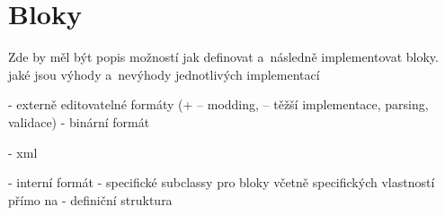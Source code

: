 
\section{Bloky}

Zde by měl být popis možností jak definovat a~následně implementovat bloky. jaké jsou výhody a~nevýhody jednotlivých implementací

- externě editovatelné formáty (+ -- modding, -- těžší implementace, parsing, validace)
- binární formát

- xml


- interní formát
- specifické subclassy pro bloky včetně specifických vlastností přímo na 
- definiční struktura





